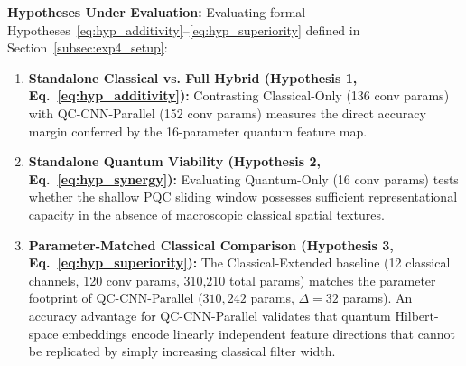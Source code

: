 \documentclass[journal]{IEEEtran}
\begin{document}
\textbf{Hypotheses Under Evaluation:}
Evaluating formal Hypotheses~\eqref{eq:hyp_additivity}--\eqref{eq:hyp_superiority} defined in Section~\ref{subsec:exp4_setup}:
\begin{enumerate}
    \item \textbf{Standalone Classical vs. Full Hybrid (Hypothesis 1, Eq.~\eqref{eq:hyp_additivity}):} Contrasting Classical-Only (136 conv params) with QC-CNN-Parallel (152 conv params) measures the direct accuracy margin conferred by the 16-parameter quantum feature map.
    \item \textbf{Standalone Quantum Viability (Hypothesis 2, Eq.~\eqref{eq:hyp_synergy}):} Evaluating Quantum-Only (16 conv params) tests whether the shallow PQC sliding window possesses sufficient representational capacity in the absence of macroscopic classical spatial textures.
    \item \textbf{Parameter-Matched Classical Comparison (Hypothesis 3, Eq.~\eqref{eq:hyp_superiority}):} The Classical-Extended baseline (12 classical channels, 120 conv params, 310,210 total params) matches the parameter footprint of QC-CNN-Parallel ($310,242$ params, $\Delta = 32$ params). An accuracy advantage for QC-CNN-Parallel validates that quantum Hilbert-space embeddings encode linearly independent feature directions that cannot be replicated by simply increasing classical filter width.
\end{enumerate}

\begin{table}[!htbp]
\centering
\caption{Experiment 4: Multi-Branch Ablation Study Specifications and Benchmark Accuracies}
\label{tab:ablation_results}
\renewcommand{\arraystretch}{1.2}
\end{table}
\end{document}
